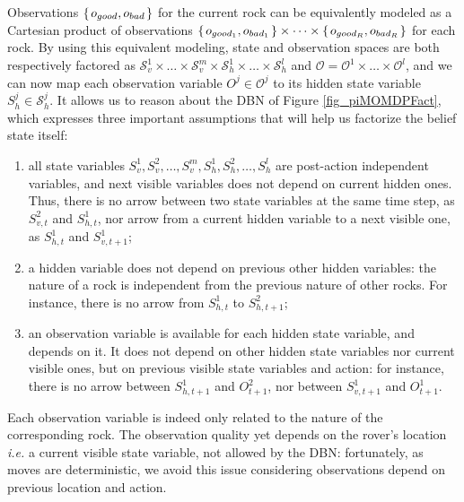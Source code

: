 Observations $\left\{ \left.  o_{good},o_{bad}  \right. \right\}$ for the current rock can be equivalently 
modeled as a Cartesian product of observations $\left\{ \left.  o_{good_1},o_{bad_1}  \right. \right\} \times \cdots \times \left\{ \left.  o_{good_R},o_{bad_R}  \right. \right\}$ 
for each rock. By using this equivalent modeling, state and observation spaces 
are both respectively factored as 
$\mathcal{S}^1_v \times \ldots \times \mathcal{S}^m_v \times \mathcal{S}^1_h \times \ldots \times \mathcal{S}^l_h $
 and $\mathcal{O} = \mathcal{O}^1 \times \ldots \times \mathcal{O}^l$, and we can now map each observation variable 
$O^j \in \mathcal{O}^j$ to its hidden state variable $S^j_h \in \mathcal{S}^j_h$. 
It allows us to reason 
about the DBN of Figure \ref{fig_piMOMDPFact}, 
which expresses three important assumptions 
that will help us factorize the belief state itself:
\begin{enumerate}
\item all state variables $S^1_v,S^2_v,\ldots,S^m_v,S^1_h,S^2_h,\ldots,S^l_h$ are post-action independent 
variables, and next visible variables does not depend on current hidden ones.
Thus, there is no arrow between two state variables at the same time step, as $S^2_{v,t}$ and $S^1_{h,t}$,
nor arrow from a current hidden variable to a next visible one, as $S^1_{h,t}$ and $S^1_{v,t+1}$;
\item a hidden variable does not depend on previous other hidden variables: the nature of a rock is 
independent from the previous nature of other rocks. 
For instance, there is no arrow from $S^1_{h,t}$ to $S^2_{h,t+1}$;
\item an observation variable is available for each hidden state variable,
and depends on it. 
It does not depend on other 
hidden state variables 
nor current visible ones, 
but on previous visible state variables and action:
for instance, there is no arrow between $S^1_{h,t+1}$ and $O^2_{t+1}$, 
nor between $S^1_{v,t+1}$ and $O^1_{t+1}$. 
\end{enumerate}
Each observation 
variable is indeed only related 
to the nature of the corresponding rock. 
The observation quality yet depends on the rover's location 
\emph{i.e.} a current visible state variable, 
not allowed by the DBN: 
fortunately, as moves are deterministic, 
we avoid this issue considering observations depend on previous location and action.


